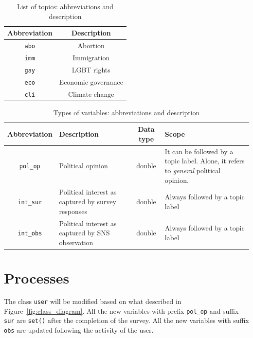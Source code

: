\documentclass[a4paper]{article}
\begin{document}
\begin{table}[]
  \centering
\begin{tabular}{cc}
\textbf{Abbreviation} & \textbf{Description} \\ \hline
\verb|abo| & Abortion                   \\
\verb|imm| & Immigration                \\
\verb|gay| & LGBT rights                \\
\verb|eco| & Economic governance        \\
\verb|cli| & Climate change            
\end{tabular}
\caption{List of topics: abbreviations and description}
\label{tab:topics}
\end{table}

\begin{table}[]
    \centering
\begin{tabular}{cp{3.5cm}cp{3.5cm}}
\textbf{Abbreviation} & \textbf{Description} & \textbf{Data type} & \textbf{Scope} \\ \hline
\verb|pol_op| & Political opinion & double & It can be followed by a topic label. Alone, it refers to \textit{general} political opinion. \\
\verb|int_sur| & Political interest  as captured by survey responses & double & Always followed by a topic label  \\
\verb|int_obs| & Political interest as captured by SNS observation & double & Always followed by a topic label       
\end{tabular}
\caption{Types of variables: abbreviations and description}
\label{tab:type_variables}
\end{table}

\section{Processes}

The class \verb|user| will be modified based on what described in Figure~\ref{fig:class_diagram}. All the new variables with prefix \verb|pol_op| and suffix \verb|sur| are \verb|set()| after the completion of the survey. All the new variables with suffix \verb|obs| are updated following the activity of the user.
\end{document}
